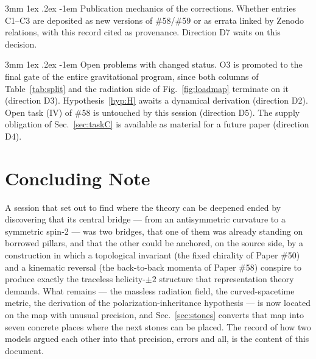 \documentclass[%
 reprint, amsmath,amssymb, aps, prb, ]{revtex4-2}
\makeatletter
\numberwithin{equation}{section}
\renewcommand\paragraph{%
  \@startsection{paragraph}{4}{\z@}%
    {3mm \@plus 1ex \@minus .2ex}%
    {-1em}%
    {\normalfont\normalsize\itshape}}
\makeatother
\begin{document}
\paragraph{Publication mechanics of the corrections.} Whether entries C1--C3 are deposited as new versions of \#58/\#59 or as errata linked by Zenodo relations, with this record cited as provenance. Direction D7 waits on this decision.

\paragraph{Open problems with changed status.} O3 is promoted to the final gate of the entire gravitational program, since both columns of Table~\ref{tab:split} and the radiation side of Fig.~\ref{fig:loadmap} terminate on it (direction D3). Hypothesis~\ref{hyp:H} awaits a dynamical derivation (direction D2). Open task (IV) of \#58 is untouched by this session (direction D5). The supply obligation of Sec.~\ref{sec:taskC} is available as material for a future paper (direction D4).

\section{Concluding Note}

A session that set out to find where the theory can be deepened ended by discovering that its central bridge --- from an antisymmetric curvature to a symmetric spin-2 --- was two bridges, that one of them was already standing on borrowed pillars, and that the other could be anchored, on the source side, by a construction in which a topological invariant (the fixed chirality of Paper \#50) and a kinematic reversal (the back-to-back momenta of Paper \#58) conspire to produce exactly the traceless helicity-$\pm2$ structure that representation theory demands. What remains --- the massless radiation field, the curved-spacetime metric, the derivation of the polarization-inheritance hypothesis --- is now located on the map with unusual precision, and Sec.~\ref{sec:stones} converts that map into seven concrete places where the next stones can be placed. The record of how two models argued each other into that precision, errors and all, is the content of this document.
\end{document}
